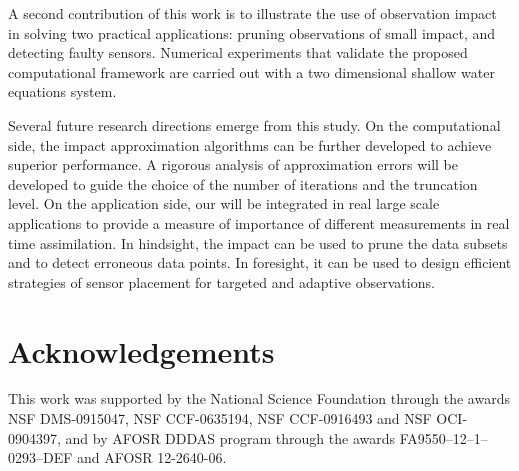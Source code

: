 \documentclass[final,sort&compress]{elsarticle}
\begin{document}
A second contribution of this work is to illustrate the use of observation impact 
in solving two practical applications: pruning observations of small impact, and detecting faulty sensors. 
Numerical experiments that validate the proposed computational framework are carried out with a two dimensional 
shallow water equations system.

Several future research directions emerge from this study.
On the computational side, the impact approximation algorithms can be further developed to achieve superior performance.
A rigorous analysis of approximation errors will be developed to guide the choice of the number of iterations and
the truncation level.
On the application side, our will be integrated in real large scale applications to provide a measure of importance 
of different measurements in real time assimilation.
In hindsight, the impact can be used to prune the data subsets and to detect erroneous data points.
In foresight, it can be used to design efficient strategies of sensor placement for targeted and adaptive observations.

\section*{Acknowledgements}

This work was supported by the National Science Foundation through the awards NSF DMS-0915047, NSF CCF-0635194, NSF CCF-0916493 and NSF OCI-0904397,
and by AFOSR DDDAS program through the awards FA9550--12--1--0293--DEF and AFOSR 12-2640-06.





\end{document}
